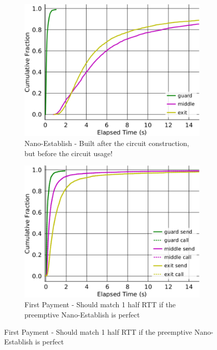 \begin{figure}[t] \centering
  \begin{subfigure}[t]{0.32\textwidth} \centering
    \includegraphics[trim={0 0cm 0 0cm}, clip, width=1.0\textwidth]{images/payment_establish.pdf}
    \caption{Nano-Establish - Built after the circuit construction, but before the circuit usage!}
    \label{fig:payments_establish}
  \end{subfigure}
  \begin{subfigure}[t]{0.32\textwidth} \centering
    \includegraphics[trim={0 0cm 0 0cm}, clip, width=1.0\textwidth]{images/payment_pay.pdf}
    \caption{First Payment - Should match 1 half RTT if the preemptive Nano-Establish is perfect}

\end{subfigure}
\end{figure}
